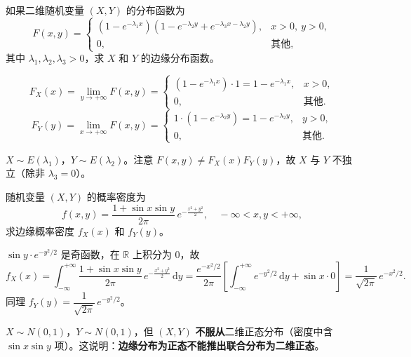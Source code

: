 \documentclass[lang=cn,11pt]{elegantbook}
\begin{document}
\begin{exercise}[边缘分布函数] \label{exer:3-c4}
如果二维随机变量 $(X,Y)$ 的分布函数为
\[
F(x,y) = \begin{cases} (1-e^{-\lambda_1 x})(1-e^{-\lambda_2 y} + e^{-\lambda_3 x-\lambda_2 y}), & x > 0,\ y > 0, \\ 0, & \text{其他}, \end{cases}
\]
其中 $\lambda_1, \lambda_2, \lambda_3 > 0$，求 $X$ 和 $Y$ 的边缘分布函数。
\end{exercise}
\begin{solution}
\[
F_X(x) = \lim_{y\to+\infty}F(x,y) = \begin{cases} (1-e^{-\lambda_1 x})\cdot 1 = 1-e^{-\lambda_1 x}, & x > 0, \\ 0, & \text{其他}. \end{cases}
\]
\[
F_Y(y) = \lim_{x\to+\infty}F(x,y) = \begin{cases} 1\cdot(1-e^{-\lambda_2 y}) = 1-e^{-\lambda_2 y}, & y > 0, \\ 0, & \text{其他}. \end{cases}
\]
\begin{note}
$X \sim E(\lambda_1)$，$Y \sim E(\lambda_2)$。注意 $F(x,y) \neq F_X(x)F_Y(y)$，故 $X$ 与 $Y$ 不独立（除非 $\lambda_3 = 0$）。
\end{note}
\end{solution}



\begin{exercise}[边缘密度不保证联合为正态] \label{exer:3-c5}
随机变量 $(X,Y)$ 的概率密度为
\[
f(x,y) = \frac{1+\sin x\sin y}{2\pi}\,e^{-\frac{x^2+y^2}{2}}, \quad -\infty < x, y < +\infty,
\]
求边缘概率密度 $f_X(x)$ 和 $f_Y(y)$。
\end{exercise}
\begin{solution}
$\sin y \cdot e^{-y^2/2}$ 是奇函数，在 $\mathbb{R}$ 上积分为 $0$，故
\[
f_X(x) = \int_{-\infty}^{+\infty}\frac{1+\sin x\sin y}{2\pi}\,e^{-\frac{x^2+y^2}{2}}\,\mathrm{d}y = \frac{e^{-x^2/2}}{2\pi}\left[\int_{-\infty}^{+\infty}e^{-y^2/2}\,\mathrm{d}y + \sin x \cdot 0\right] = \frac{1}{\sqrt{2\pi}}\,e^{-x^2/2}.
\]
同理 $f_Y(y) = \dfrac{1}{\sqrt{2\pi}}\,e^{-y^2/2}$。
\begin{note}
$X \sim N(0,1)$，$Y \sim N(0,1)$，但 $(X,Y)$ \textbf{不服从}二维正态分布（密度中含 $\sin x\sin y$ 项）。这说明：\textbf{边缘分布为正态不能推出联合分布为二维正态}。
\end{note}
\end{solution}
\end{document}
